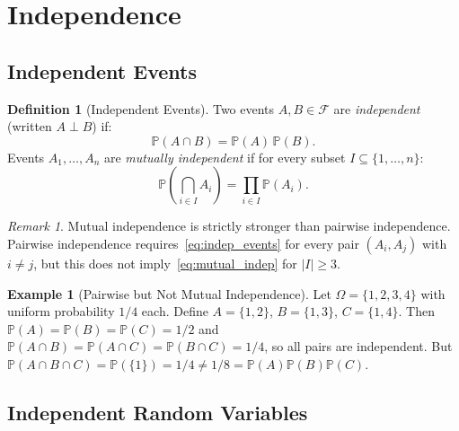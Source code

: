 \documentclass[11pt,a4paper]{article}
\theoremstyle{definition}
\newtheorem{definition}{Definition}[section]
\newtheorem{example}{Example}[section]
\theoremstyle{plain}
\theoremstyle{remark}
\newtheorem{remark}{Remark}[section]
\newcommand{\Prob}{\mathbb{P}}
\begin{document}
\section{Independence}
\label{sec:independence}

\subsection{Independent Events}
\label{subsec:indep_events}

\begin{definition}[Independent Events]
\label{def:indep_events}
Two events $A, B \in \mathcal{F}$ are \emph{independent} (written $A \perp B$) if:
\begin{equation}
    \Prob(A \cap B) = \Prob(A)\, \Prob(B).
    \label{eq:indep_events}
\end{equation}
Events $A_1, \ldots, A_n$ are \emph{mutually independent} if for every subset $I \subseteq \{1, \ldots, n\}$:
\begin{equation}
    \Prob\!\left(\bigcap_{i \in I} A_i\right) = \prod_{i \in I} \Prob(A_i).
    \label{eq:mutual_indep}
\end{equation}
\end{definition}

\begin{remark}
Mutual independence is strictly stronger than pairwise independence. Pairwise independence requires~\eqref{eq:indep_events} for every pair $(A_i, A_j)$ with $i \neq j$, but this does not imply~\eqref{eq:mutual_indep} for $|I| \geq 3$.
\end{remark}

\begin{example}[Pairwise but Not Mutual Independence]
\label{ex:pairwise_not_mutual}
Let $\Omega = \{1, 2, 3, 4\}$ with uniform probability $1/4$ each. Define $A = \{1,2\}$, $B = \{1,3\}$, $C = \{1,4\}$. Then $\Prob(A) = \Prob(B) = \Prob(C) = 1/2$ and $\Prob(A \cap B) = \Prob(A \cap C) = \Prob(B \cap C) = 1/4$, so all pairs are independent. But $\Prob(A \cap B \cap C) = \Prob(\{1\}) = 1/4 \neq 1/8 = \Prob(A)\Prob(B)\Prob(C)$.
\end{example}

\subsection{Independent Random Variables}
\label{subsec:indep_rv}
\end{document}
